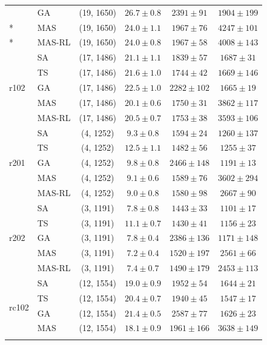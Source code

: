 {\begin{longtable}{llcccc}
 & GA & (19, 1650) & $26.7 \pm 0.8$ & $2391 \pm 91$ & $1904 \pm 199$ \\*
 & MAS & (19, 1650) & $24.0 \pm 1.1$ & $1967 \pm 76$ & $4247 \pm 101$ \\*
 & MAS-RL & (19, 1650) & $24.0 \pm 0.8$ & $1967 \pm 58$ & $4008 \pm 143$ \\
\midrule
\multirow{5}{*}{r102} & SA & (17, 1486) & $21.1 \pm 1.1$ & $1839 \pm 57$ & $1687 \pm 31$ \\*
 & TS & (17, 1486) & $21.6 \pm 1.0$ & $1744 \pm 42$ & $1669 \pm 146$ \\*
 & GA & (17, 1486) & $22.5 \pm 1.0$ & $2282 \pm 102$ & $1665 \pm 19$ \\*
 & MAS & (17, 1486) & $20.1 \pm 0.6$ & $1750 \pm 31$ & $3862 \pm 117$ \\*
 & MAS-RL & (17, 1486) & $20.5 \pm 0.7$ & $1753 \pm 38$ & $3593 \pm 106$ \\
\midrule
\multirow{5}{*}{r201} & SA & (4, 1252) & $9.3 \pm 0.8$ & $1594 \pm 24$ & $1260 \pm 137$ \\*
 & TS & (4, 1252) & $12.5 \pm 1.1$ & $1482 \pm 56$ & $1255 \pm 37$ \\*
 & GA & (4, 1252) & $9.8 \pm 0.8$ & $2466 \pm 148$ & $1191 \pm 13$ \\*
 & MAS & (4, 1252) & $9.1 \pm 0.6$ & $1589 \pm 76$ & $3602 \pm 294$ \\*
 & MAS-RL & (4, 1252) & $9.0 \pm 0.8$ & $1580 \pm 98$ & $2667 \pm 90$ \\
\midrule
\multirow{5}{*}{r202} & SA & (3, 1191) & $7.8 \pm 0.8$ & $1443 \pm 33$ & $1101 \pm 17$ \\*
 & TS & (3, 1191) & $11.1 \pm 0.7$ & $1430 \pm 41$ & $1156 \pm 23$ \\*
 & GA & (3, 1191) & $7.8 \pm 0.4$ & $2386 \pm 136$ & $1171 \pm 148$ \\*
 & MAS & (3, 1191) & $7.2 \pm 0.4$ & $1520 \pm 197$ & $2561 \pm 66$ \\*
 & MAS-RL & (3, 1191) & $7.4 \pm 0.7$ & $1490 \pm 179$ & $2453 \pm 113$ \\
\midrule
\multirow{5}{*}{rc102} & SA & (12, 1554) & $19.0 \pm 0.9$ & $1952 \pm 54$ & $1644 \pm 21$ \\*
 & TS & (12, 1554) & $20.4 \pm 0.7$ & $1940 \pm 45$ & $1547 \pm 17$ \\*
 & GA & (12, 1554) & $21.4 \pm 0.5$ & $2587 \pm 77$ & $1626 \pm 23$ \\*
 & MAS & (12, 1554) & $18.1 \pm 0.9$ & $1961 \pm 166$ & $3638 \pm 149$ \\*

\end{longtable}}
